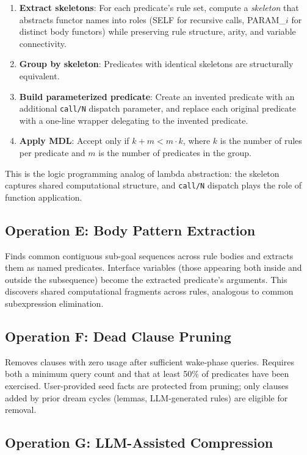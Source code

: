 \documentclass[10pt,conference]{IEEEtran}
\begin{document}
\begin{enumerate}
\item \textbf{Extract skeletons}: For each predicate's rule set, compute a \emph{skeleton} that abstracts functor names into roles (\textsc{SELF} for recursive calls, \textsc{PARAM\_$i$} for distinct body functors) while preserving rule structure, arity, and variable connectivity.
\item \textbf{Group by skeleton}: Predicates with identical skeletons are structurally equivalent.
\item \textbf{Build parameterized predicate}: Create an invented predicate with an additional \texttt{call/N} dispatch parameter, and replace each original predicate with a one-line wrapper delegating to the invented predicate.
\item \textbf{Apply MDL}: Accept only if $k + m < m \cdot k$, where $k$ is the number of rules per predicate and $m$ is the number of predicates in the group.
\end{enumerate}

This is the logic programming analog of lambda abstraction: the skeleton captures shared computational structure, and \texttt{call/N} dispatch plays the role of function application.

\subsection{Operation E: Body Pattern Extraction}

Finds common contiguous sub-goal sequences across rule bodies and extracts them as named predicates. Interface variables (those appearing both inside and outside the subsequence) become the extracted predicate's arguments. This discovers shared computational fragments across rules, analogous to common subexpression elimination.

\subsection{Operation F: Dead Clause Pruning}

Removes clauses with zero usage after sufficient wake-phase queries. Requires both a minimum query count and that at least 50\% of predicates have been exercised. User-provided seed facts are protected from pruning; only clauses added by prior dream cycles (lemmas, LLM-generated rules) are eligible for removal.

\subsection{Operation G: LLM-Assisted Compression}
\label{sec:opG}
\end{document}
